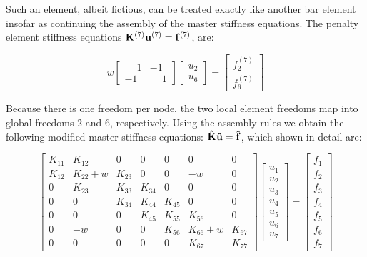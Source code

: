 Such an element, albeit fictious, can be treated exactly like another bar element
insofar as continuing the assembly of the master stiffness equations. The penalty
element stiffness equations $ \mathbf{K}^{(7)} \mathbf{u}^{(7)} = \mathbf{f}^{(7)} $,
are:

\begin{equation}
    w \begin{bmatrix}
        \phantom{-}1 & -1 \\
        -1 & \phantom{-}1
    \end{bmatrix}
    \begin{bmatrix}
        u_2 \\
        u_6
    \end{bmatrix}
    = \begin{bmatrix}
        f_2^{(7)} \\
        f_6^{(7)}
    \end{bmatrix}
\end{equation}

Because there is one freedom per node, the two local element freedoms map into global
freedoms 2 and 6, respectively. Using the assembly rules we obtain the following
modified master stiffness equations: $ \mathbf{\hat{K}} \mathbf{\hat{u}} = \mathbf{\hat{f}} $,
which shown in detail are:

\begin{equation}\label{nb-ch3-mfc-penalty-master-stiffnes}
    \begin{bmatrix}
        K_{11} & K_{12} & 0 & 0 & 0 & 0 & 0 \\
        K_{12} & K_{22} + w & K_{23} & 0 & 0 & -w & 0 \\
        0 & K_{23} & K_{33} & K_{34} & 0 & 0 & 0 \\
        0 & 0 & K_{34} & K_{44} & K_{45} & 0 & 0 \\
        0 & 0 & 0 & K_{45} & K_{55} & K_{56} & 0 \\
        0 & -w & 0 & 0 & K_{56} & K_{66} + w & K_{67} \\
        0 & 0 & 0 & 0 & 0 & K_{67} & K_{77}
    \end{bmatrix}
    \begin{bmatrix}
        u_1 \\
        u_2 \\
        u_3 \\
        u_4 \\
        u_5 \\
        u_6 \\
        u_7
    \end{bmatrix}
    = \begin{bmatrix}
        f_1 \\
        f_2 \\
        f_3 \\
        f_4 \\
        f_5 \\
        f_6 \\
        f_7
    \end{bmatrix}
\end{equation}

